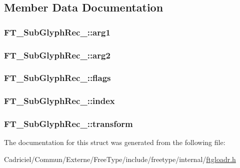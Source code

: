 \subsection{Member Data Documentation}
\hypertarget{struct_f_t___sub_glyph_rec___ad9f6b04ef50e1b39db90331e76f38206}{
\subsubsection[{arg1}]{ F\-T\-\_\-\-Sub\-Glyph\-Rec\-\_\-\-::arg1}}\label{struct_f_t___sub_glyph_rec___ad9f6b04ef50e1b39db90331e76f38206}
\hypertarget{struct_f_t___sub_glyph_rec___a0d27a8b473379cedeb061f9ecd7e97da}{
\subsubsection[{arg2}]{ F\-T\-\_\-\-Sub\-Glyph\-Rec\-\_\-\-::arg2}}\label{struct_f_t___sub_glyph_rec___a0d27a8b473379cedeb061f9ecd7e97da}
\hypertarget{struct_f_t___sub_glyph_rec___a2d02aefc16061f7e039f76074518f6e5}{
\subsubsection[{flags}]{ F\-T\-\_\-\-Sub\-Glyph\-Rec\-\_\-\-::flags}}\label{struct_f_t___sub_glyph_rec___a2d02aefc16061f7e039f76074518f6e5}
\hypertarget{struct_f_t___sub_glyph_rec___aa4febc2d867ff074ac116b068f372d3a}{
\subsubsection[{index}]{ F\-T\-\_\-\-Sub\-Glyph\-Rec\-\_\-\-::index}}\label{struct_f_t___sub_glyph_rec___aa4febc2d867ff074ac116b068f372d3a}
\hypertarget{struct_f_t___sub_glyph_rec___a3c5fc1959a357c6c2b970ec2118d2683}{
\subsubsection[{transform}]{ F\-T\-\_\-\-Sub\-Glyph\-Rec\-\_\-\-::transform}}\label{struct_f_t___sub_glyph_rec___a3c5fc1959a357c6c2b970ec2118d2683}


The documentation for this struct was generated from the following file\-:\begin{DoxyCompactItemize}
\item 
Cadriciel/\-Commun/\-Externe/\-Free\-Type/include/freetype/internal/\hyperlink{ftgloadr_8h}{ftgloadr.\-h}\end{DoxyCompactItemize}
